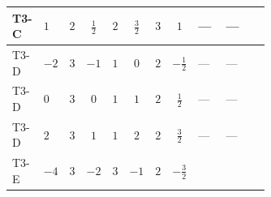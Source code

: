 \documentclass[8pt]{article}
\begin{document}
\begin{landscape}
\begin{longtable}{@{}llcccccc >{\raggedright\arraybackslash}p{0.21\linewidth} >{\raggedright\arraybackslash}p{0.21\linewidth} >{\raggedright\arraybackslash}p{0.21\linewidth}@{}}
\midrule
T3-C & $1$ & $2$ & $\frac{1}{2}$ & $2$ & $\frac{3}{2}$ & $3$ & $1$ & --- & --- & \scriptsize\adjustbox{max width=\linewidth}{$\begin{gathered} -5 \operatorname{Tr}\!\left({y_2}\,\left({y_2}\right)^{\dagger}\,{y_2}\,\left({y_2}\right)^{\dagger}\right)\end{gathered}$} \\
\midrule
T3-D & $-2$ & $3$ & $-1$ & $1$ & $0$ & $2$ & $-\frac{1}{2}$ & --- & --- & \scriptsize\adjustbox{max width=\linewidth}{$\begin{gathered} -8 \operatorname{Tr}\!\left({y_2}\,\left({y_2}\right)^{\dagger}\,{y_2}\,\left({y_2}\right)^{\dagger}\right)\end{gathered}$} \\
\midrule
T3-D & $0$ & $3$ & $0$ & $1$ & $1$ & $2$ & $\frac{1}{2}$ & --- & --- & \scriptsize\adjustbox{max width=\linewidth}{$\begin{gathered} -8 \operatorname{Tr}\!\left({y_2}\,\left({y_2}\right)^{\dagger}\,{y_2}\,\left({y_2}\right)^{\dagger}\right)\end{gathered}$} \\
\midrule
T3-D & $2$ & $3$ & $1$ & $1$ & $2$ & $2$ & $\frac{3}{2}$ & --- & --- & \scriptsize\adjustbox{max width=\linewidth}{$\begin{gathered} -8 \operatorname{Tr}\!\left({y_2}\,\left({y_2}\right)^{\dagger}\,{y_2}\,\left({y_2}\right)^{\dagger}\right)\end{gathered}$} \\
\midrule
T3-E & $-4$ & $3$ & $-2$ & $3$ & $-1$ & $2$ & $-\frac{3}{2}$ & \scriptsize\adjustbox{max width=\linewidth}{$\begin{gathered} {\lambda_{S_2}^{(1)}} (4 T_{\nu}^{(2)}+14 {\lambda_{S_2}^{(A)}})\end{gathered}$} & \scriptsize\adjustbox{max width=\linewidth}{$\begin{gathered} +2 {\lambda_{S_2}^{(A)}} T_{\nu}^{(2)}\end{gathered}$} & \scriptsize\adjustbox{max width=\linewidth}{$\begin{gathered} -3 \operatorname{Tr}\!\left({y_2}\,\left({y_2}\right)^{\dagger}\,{y_2}\,\left({y_2}\right)^{\dagger}\right)\end{gathered}$} \\
\midrule

\end{longtable}
\end{landscape}
\end{document}
